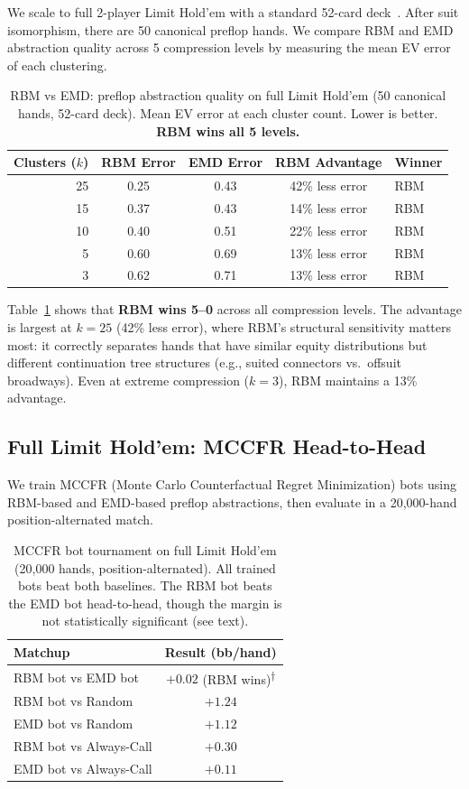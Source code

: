 \documentclass[11pt]{article}
\begin{document}
We scale to full 2-player Limit Hold'em with a standard 52-card
deck~\citep{bowling2015solving}. After suit isomorphism, there are 50
canonical preflop hands. We compare RBM and EMD abstraction quality
across 5 compression levels by measuring the mean EV error of each
clustering.

\begin{table}[t]
\centering
\caption{RBM vs EMD: preflop abstraction quality on full Limit Hold'em
(50 canonical hands, 52-card deck). Mean EV error at each cluster count.
Lower is better. \textbf{RBM wins all 5 levels.}}
\label{tab:holdem-preflop}
\begin{tabular}{rcccl}
\toprule
Clusters ($k$) & RBM Error & EMD Error & RBM Advantage & Winner \\
\midrule
25 & 0.25 & 0.43 & 42\% less error & RBM \\
15 & 0.37 & 0.43 & 14\% less error & RBM \\
10 & 0.40 & 0.51 & 22\% less error & RBM \\
 5 & 0.60 & 0.69 & 13\% less error & RBM \\
 3 & 0.62 & 0.71 & 13\% less error & RBM \\
\bottomrule
\end{tabular}
\end{table}

Table~\ref{tab:holdem-preflop} shows that \textbf{RBM wins 5--0} across
all compression levels. The advantage is largest at $k = 25$ (42\% less
error), where RBM's structural sensitivity matters most: it correctly
separates hands that have similar equity distributions but different
continuation tree structures (e.g., suited connectors vs.\ offsuit
broadways). Even at extreme compression ($k = 3$), RBM maintains a 13\%
advantage.

\subsection{Full Limit Hold'em: MCCFR Head-to-Head}

We train MCCFR (Monte Carlo Counterfactual Regret Minimization) bots
using RBM-based and EMD-based preflop abstractions, then evaluate in a
20{,}000-hand position-alternated match.

\begin{table}[t]
\centering
\caption{MCCFR bot tournament on full Limit Hold'em (20{,}000 hands,
position-alternated). All trained bots beat both baselines. The RBM bot
beats the EMD bot head-to-head, though the margin is not statistically
significant (see text).}
\label{tab:holdem-cfr}
\begin{tabular}{lc}
\toprule
Matchup & Result (bb/hand) \\
\midrule
RBM bot vs EMD bot & $+0.02$ (RBM wins)\textsuperscript{$\dagger$} \\
RBM bot vs Random & $+1.24$ \\
EMD bot vs Random & $+1.12$ \\
RBM bot vs Always-Call & $+0.30$ \\
EMD bot vs Always-Call & $+0.11$ \\
\bottomrule
\end{tabular}
\end{table}
\end{document}
